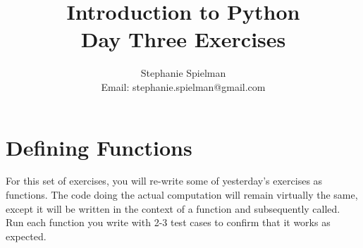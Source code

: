\documentclass{article}[12pt]
\begin{document}
\title{Introduction to Python \\ Day Three Exercises}
\author{Stephanie Spielman \\ \footnotesize{Email: stephanie.spielman@gmail.com}}
\date{}
\maketitle{}

\section{Defining Functions}

For this set of exercises, you will re-write some of yesterday's exercises as functions. The code doing the actual computation will remain virtually the same, except it will be written in the context of a function and subsequently called. Run each function you write with 2-3 test cases to confirm that it works as expected.
\end{document}

